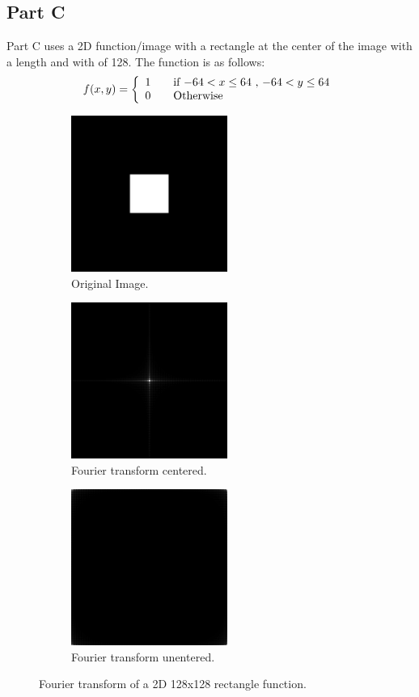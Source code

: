 \documentclass[letter]{article}
\begin{document}
\subsection{Part C}
Part C uses a 2D function/image with a rectangle at the center of the image with a length and with of 128. The function is as follows: $$f(x,y) = \left \{ \begin{array}{l l} 1 & \quad \text{if $-64 < x \leq 64$ , $-64 < y \leq 64$}\\ 0 & \quad \text{Otherwise}\end{array} \right.$$

\begin{figure}[hbtp]
  \centering
  \begin{subfigure}{5.1cm}
    \includegraphics[width=5.1cm]{images/rect_512_128x128.png}
    \caption{Original Image.}
  \end{subfigure}
  \begin{subfigure}{5.1cm}
    \includegraphics[width=5.1cm]{images/rect_512_128x128_FU_centered.png}
    \caption{Fourier transform centered.}
  \end{subfigure}
  \begin{subfigure}{5.1cm}
    \includegraphics[width=5.1cm]{images/rect_512_128x128_FU.png}
    \caption{Fourier transform unentered.}
  \end{subfigure}
  \caption{Fourier transform of a 2D 128x128 rectangle function.}
  \label{fig:ft_128128}
\end{figure}
\end{document}
